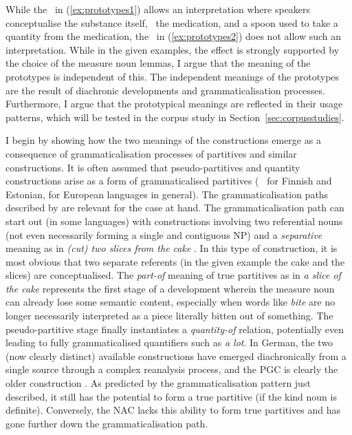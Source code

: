While the \PGCd\ in (\ref{ex:prototypes1}) allows an interpretation where speakers conceptualise the substance itself, \ie\ the medication, and a spoon used to take a quantity from the medication, the \NACb\ in (\ref{ex:prototypes2}) does not allow such an interpretation.
While in the given examples, the effect is strongly supported by the choice of the measure noun lemmas, I argue that the meaning of the prototypes is independent of this.
The independent meanings of the prototypes are the result of diachronic developments and grammaticalisation processes.
Furthermore, I argue that the prototypical meanings are reflected in their usage patterns, which will be tested in the corpus study in Section~\ref{sec:corpusstudies}.

I begin by showing how the two meanings of the constructions emerge as a consequence of grammaticalisation processes of partitives and similar constructions.
It is often assumed that pseudo-partitives and quantity constructions arise as a form of grammaticalised partitives (\eg\ \citealp[536--539]{Koptjevskaja2001} for Finnish and Estonian, \citealp[559]{Koptjevskaja2001} for European languages in general).
The grammaticalisation paths described by \citet[esp.\ 526--530]{Koptjevskaja2001} are relevant for the case at hand.
The grammaticalisation path can start out (in some languages) with constructions involving two referential nouns (not even necessarily forming a single and contiguous NP) and a \textit{separative} meaning as in \textit{(cut) two slices from the cake} \citep[535]{Koptjevskaja2001}.
In this type of construction, it is most obvious that two separate referents (in the given example the cake and the slices) are conceptualised.
The \textit{part-of} meaning of true partitives as in \textit{a slice of the cake} represents the first stage of a development wherein the measure noun can already lose some semantic content, especially when words like \textit{bite} are no longer necessarily interpreted as a piece literally bitten out of something.
The pseudo-partitive stage finally instantiates a \textit{quantity-of} relation, potentially even leading to fully grammaticalised quantifiers such as \textit{a lot}.
In German, the two (now clearly distinct) available constructions have emerged diachronically from a single source through a complex reanalysis process, and the PGC is clearly the older construction \citep[2--4]{Zimmer2015}.
As predicted by the grammaticalisation pattern just described, it still has the potential to form a true partitive (if the kind noun is definite).
Conversely, the NAC lacks this ability to form true partitives and has gone further down the grammaticalisation path.
